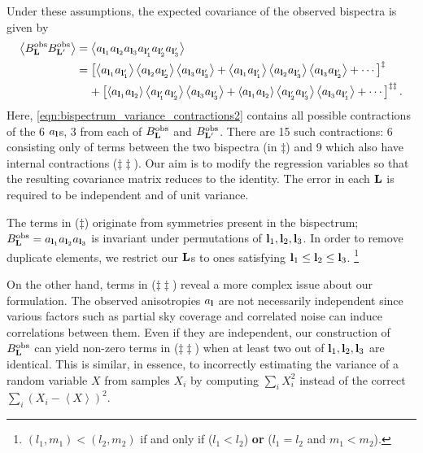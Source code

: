 Under these assumptions, the expected covariance of the observed bispectra is given by
\begin{align}
	\left< B^\text{obs}_\mathbf{L} B^\text{obs}_{\mathbf{L}'} \right> &= \left< a_{\mathbf{l}_1} a_{\mathbf{l}_2} a_{\mathbf{l}_3} a_{\mathbf{l}'_1} a_{\mathbf{l}'_2} a_{\mathbf{l}'_3} \right> 
	\label{eqn:bispectrum_variance_contractions1} \\
	&= \left[ \left< a_{\mathbf{l}_1} a_{\mathbf{l}'_1} \right> \left< a_{\mathbf{l}_2} a_{\mathbf{l}'_2} \right> \left< a_{\mathbf{l}_3} a_{\mathbf{l}'_3} \right> + \left< a_{\mathbf{l}_1} a_{\mathbf{l}'_1} \right> \left< a_{\mathbf{l}_2} a_{\mathbf{l}'_3} \right> \left< a_{\mathbf{l}_3} a_{\mathbf{l}'_2} \right> + \cdots \right]^\ddagger \nonumber \\
	&\;\;\;\; + \left[ \left< a_{\mathbf{l}_1} a_{\mathbf{l}_2} \right> \left< a_{\mathbf{l}'_1} a_{\mathbf{l}'_2} \right> \left< a_{\mathbf{l}_3} a_{\mathbf{l}'_3} \right> + \left< a_{\mathbf{l}_1} a_{\mathbf{l}_2} \right> \left< a_{\mathbf{l}'_2} a_{\mathbf{l}'_3} \right> \left< a_{\mathbf{l}_3} a_{\mathbf{l}'_1} \right> + \cdots \right]^{\ddagger\ddagger} \label{eqn:bispectrum_variance_contractions2}.
\end{align}
Here, \eqref{eqn:bispectrum_variance_contractions2} contains all possible contractions of the 6 $a_\mathbf{l}$s, 3 from each of $B^\text{obs}_\mathbf{L}$ and $B^\text{obs}_{\mathbf{L}'}$. There are 15 such contractions: 6 consisting only of terms between the two bispectra (in $\ddagger$) and 9 which also have internal contractions ($\ddagger\ddagger$). Our aim is to modify the regression variables so that the resulting covariance matrix reduces to the identity. The error in each $\mathbf{L}$ is required to be independent and of unit variance.

The terms in ($\ddagger$) originate from symmetries present in the bispectrum; $B^\text{obs}_\mathbf{L} = a_{\mathbf{l}_1}  a_{\mathbf{l}_2}  a_{\mathbf{l}_3}$ is invariant under permutations of ${\mathbf{l}_1, \mathbf{l}_2, \mathbf{l}_3}$. In order to remove duplicate elements, we restrict our $\mathbf{L}$s to ones satisfying $\mathbf{l}_1 \le \mathbf{l}_2 \le \mathbf{l}_3$. \footnote{$(l_1,m_1) < (l_2,m_2)$ if and only if ($l_1 < l_2$) \textbf{or} ($l_1 = l_2$ and $m_1 < m_2$).}

On the other hand, terms in ($\ddagger\ddagger$) reveal a more complex issue about our formulation. The observed anisotropies $a_\mathbf{l}$ are not necessarily independent since various factors such as partial sky coverage and correlated noise can induce correlations between them. Even if they are independent, our construction of $B^\text{obs}_\mathbf{L}$ can yield non-zero terms in ($\ddagger\ddagger$) when at least two out of $\mathbf{l}_1, \mathbf{l}_2, \mathbf{l}_3$ are identical. This is similar, in essence, to incorrectly estimating the variance of a random variable $X$ from samples $X_i$ by computing $\sum_i X_i^2$ instead of the correct $\sum_i (X_i- \left< X \right>)^2$.

